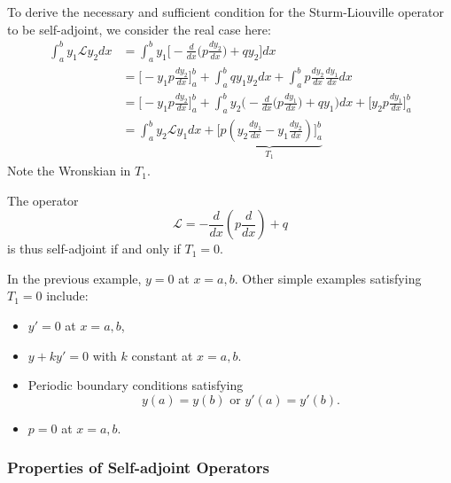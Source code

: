 \documentclass[a4paper]{article}
\renewcommand*{\L}{\mathcal{L}}
\begin{document}
To derive the necessary and sufficient condition for the Sturm-Liouville operator to be self-adjoint, we consider the real case here:
\begin{align*}
  \int_{a}^{b} y_1\L y_2 dx &= \int_{a}^{b} y_1 \Big[ -\frac{d}{dx} \big(p \frac{dy_2}{dx} \big) + qy_2 \Big] dx \\
                         &= \Big[-y_1 p\frac{dy_2}{dx} \Big]^b_a + \int_{a}^{b} qy_1y_2  dx + \int_{a}^{b} p\frac{dy_2}{dx} \frac{dy_1}{dx} dx \\
                         &= \Big[-y_1p \frac{dy_2}{dx} \Big]^b_a + \int_{a}^{b} y_2\Big(-\frac{d}{dx} \big(p \frac{dy_1}{dx} \big)+ qy_1 \Big) dx + \Big[ y_2p \frac{dy_1}{dx} \Big]^b_a \\
                         &= \int_{a}^{b} y_2\L y_1 dx + \underbrace{\Big[ p(y_2 \frac{dy_1}{dx} - y_1 \frac{dy_2}{dx})\Big]^b_a}_{T_1} 
\end{align*}
Note the Wronskian in \(T_1\).

The operator
\[
  \L = -\frac{d}{dx}(p \frac{d}{dx}) + q
\]
is thus self-adjoint if and only if \(T_1=0\).

In the previous example, \(y=0\) at \(x=a,b\). Other simple examples satisfying \(T_1=0\) include:
\begin{itemize}
\item \(y'=0\) at \(x=a,b\),
\item \(y+ky'=0\) with \(k\) constant at \(x=a,b\).
\item Periodic boundary conditions satisfying
\[
y(a) = y(b) \text{ or } y'(a) = y'(b).
\]
\item \(p=0\) at \(x=a,b\).
\end{itemize}

\subsubsection{Properties of Self-adjoint Operators}
\end{document}
